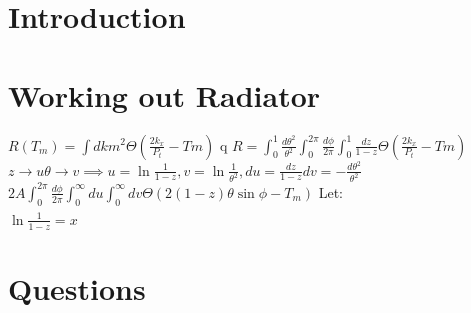 \documentclass[12pt,twoside]{article}
\begin{document}



\section{Introduction}

\section{Working out Radiator}
$R(T_m) = \int dk m^2 \Theta \left(\frac{2k_x}{P_t} - Tm\right)$
q
$R = \int_{0}^{1} \frac{d \theta ^2}{\theta ^2} \int_{0}^{2\pi} \frac{d\phi}{2\pi} \int_{0}^{1} \frac{dz}{1-z} \Theta \left(\frac{2k_x}{P_t} - Tm\right)$
$z \to u\theta \to v \implies u = \ln{\frac{1}{1-z}}, v = \ln{\frac{1}{\theta ^2}}, du = \frac{dz}{1-z} dv = -\frac{d\theta^2}{\theta^2}$
$2A \int_{0}^{2\pi} \frac{d\phi}{2\pi} \int_{0}^{\infty} du \int_{0}^{\infty} dv \Theta (2(1-z)\theta \sin{\phi} - T_m) $
Let:
\begin{align}
  
\end{align}$\ln{\frac{1}{1-z}} =x$

\section{Questions}
\end{document}
